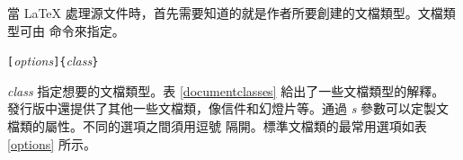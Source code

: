 
當 \LaTeX{} 處理源文件時，首先需要知道的就是作者所要創建的文檔類型。文檔類型可由  命令來指定。
\begin{lscommand}
\verb|[|\emph{options}\verb|]{|\emph{class}\verb|}|
\end{lscommand}

\noindent
\emph{class} 指定想要的文檔類型。表 \ref{documentclasses} 給出了一些文檔類型的解釋。\LaTeXe{} 發行版中還提供了其他一些文檔類，像信件和幻燈片等。通過 \emph{s} 參數可以定製文檔類的屬性。不同的選項之間須用逗號
隔開。標準文檔類的最常用選項如表 \ref{options} 所示。

